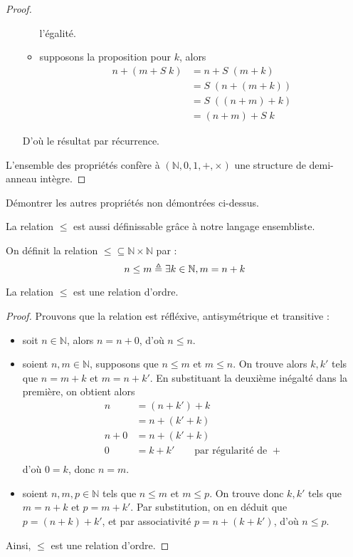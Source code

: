\begin{proof}
\begin{itemize}
\begin{itemize}
      l'égalité.
    \item supposons la proposition pour $k$, alors
      \begin{align*}
        n+(m+S\;k) &= n + S\;(m + k)\\
        &= S\;(n+(m+k))\\
        &= S\;((n+m)+k)\\
        &= (n+m)+S\;k
      \end{align*}
    \end{itemize}
    D'où le résultat par récurrence.
  \end{itemize}
  L'ensemble des propriétés confère à $(\mathbb N,0,1,+,\times)$ une structure
  de demi-anneau intègre.
\end{proof}

\begin{exercise}
  Démontrer les autres propriétés non démontrées ci-dessus.
\end{exercise}

La relation $\leq$ est aussi définissable grâce à notre langage ensembliste.

\begin{definition}[Inégalité]
  On définit la relation $\leq\subseteq \mathbb N \times \mathbb N$ par :
  \[n \leq m \triangleq \exists k \in \mathbb N, m = n + k\]
\end{definition}

\begin{property}
  La relation $\leq$ est une relation d'ordre.
\end{property}

\begin{proof}
  Prouvons que la relation est réfléxive, antisymétrique et transitive :
  \begin{itemize}
  \item soit $n\in \mathbb N$, alors $n = n + 0$, d'où $n\leq n$.
  \item soient $n,m\in \mathbb N$, supposons que $n \leq m$ et $m \leq n$. On
    trouve alors $k,k'$ tels que $n = m + k$ et $m = n + k'$. En substituant
    la deuxième inégalté dans la première, on obtient alors
    \begin{align*}
      n &= (n + k') + k\\
      &= n + (k' + k)\\
      n + 0 &= n + (k' + k)\\
      0 &= k + k'\qquad\text{par régularité de }+\\
    \end{align*}
    d'où $0 = k$, donc $n = m$.
  \item soient $n,m,p\in \mathbb N$ tels que $n\leq m$ et $m\leq p$. On trouve
    donc $k,k'$ tels que $m = n + k$ et $p = m + k'$. Par substitution, on en
    déduit que $p = (n + k) + k'$, et par associativité $p = n + (k + k')$, d'où
    $n \leq p$.
  \end{itemize}
  Ainsi, $\leq$ est une relation d'ordre.
\end{proof}

